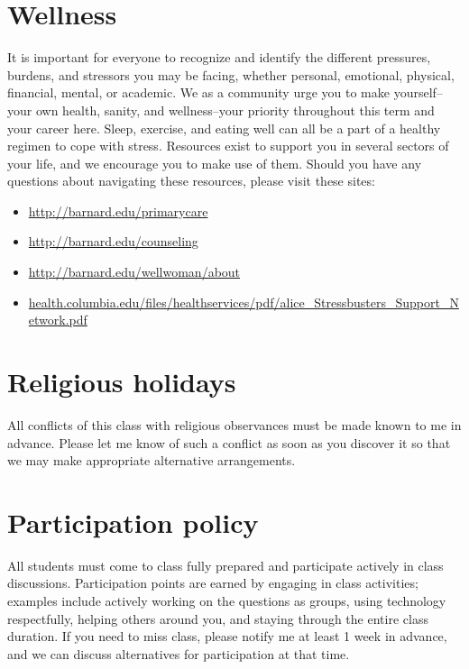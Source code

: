 \documentclass{article}
\begin{document}
\section*{Wellness}
It is important for everyone to recognize and identify the different pressures, burdens, and stressors you may be facing, whether personal, emotional, physical, financial, mental, or academic. We as a community urge you to make yourself--your own health, sanity, and wellness--your priority throughout this term and your career here. Sleep, exercise, and eating well can all be a part of a healthy regimen to cope with stress. Resources exist to support you in several sectors of your life, and we encourage you to make use of them. Should you have any questions about navigating these resources, please visit these sites:
\begin{itemize}
    \item \url{http://barnard.edu/primarycare}
    \item \url{http://barnard.edu/counseling}
    \item \url{http://barnard.edu/wellwoman/about}
    \item \url{health.columbia.edu/files/healthservices/pdf/alice_Stressbusters_Support_Network.pdf}
\end{itemize}

\section*{Religious holidays}
All conflicts of this class with religious observances must be made known to me in advance. Please let me know of such a conflict as soon as you discover it so that we may make appropriate alternative arrangements.

\section*{Participation policy}
All students must come to class fully prepared and participate actively in class discussions. Participation points are earned by engaging in class activities; examples include actively working on the questions as groups, using technology respectfully, helping others around you, and staying through the entire class duration. If you need to miss class, please notify me at least 1 week in advance, and we can discuss alternatives for participation at that time.

\pagebreak
\end{document}
